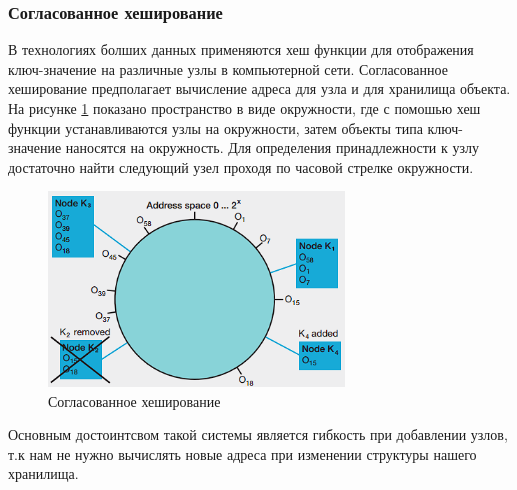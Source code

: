 \documentclass{article}
\begin{document}
\subsubsection{Согласованное хеширование}
В технологиях болших данных применяются хеш функции для отображения ключ-значение на различные узлы в компьютерной сети. Согласованное хеширование предполагает вычисление адреса для узла и для хранилища объекта.\\
На рисунке \ref{img3} показано пространство в виде окружности, где с помошью хеш функции устанавливаются узлы на окружности, затем объекты типа ключ-значение наносятся на окружность.
Для определения принадлежности к узлу достаточно найти следующий узел проходя по часовой стрелке окружности. 
\begin{figure}[ht]
    \centering
    \includegraphics[width=0.7\textwidth]{images/consistent_hash.png}
    \caption{Согласованное хеширование}
    \label{img3}
\end{figure}
\newpage
Основным достоинтсвом такой системы является гибкость при добавлении узлов, т.к нам не нужно вычислять новые адреса при изменении структуры нашего хранилища.
\end{document}
